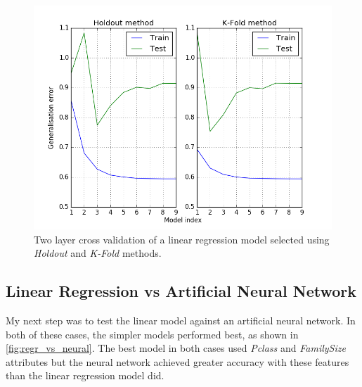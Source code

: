 \documentclass[a4paper]{scrartcl}
\begin{document}
\begin{figure}
  \includegraphics[scale=.3]{graphs/holdout_vs_kfold.png}
  \centering
  \caption{Two layer cross validation of a linear regression model selected using \emph{Holdout} and \emph{K-Fold} methods.}
  \label{fig:holdout_vs_kfold}
\end{figure}

\subsection{Linear Regression vs Artificial Neural Network}
My next step was to test the linear model against an artificial neural network. In both of these cases, the simpler models performed best, as shown in \ref{fig:regr_vs_neural}. The best model in both cases used \emph{Pclass} and \emph{FamilySize} attributes but the neural network achieved greater accuracy with these features than the linear regression model did.
\end{document}
